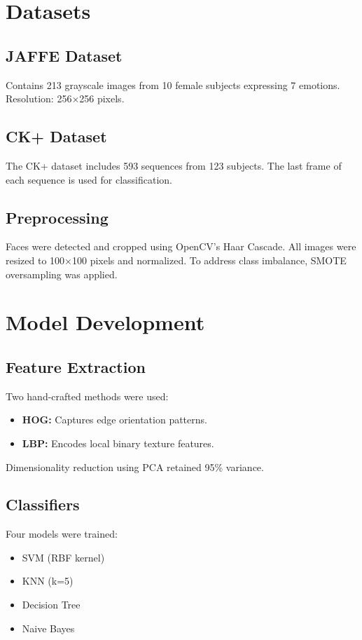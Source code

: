 \documentclass[12pt,a4paper]{article}
\begin{document}
\section{Datasets}
\subsection{JAFFE Dataset}
Contains 213 grayscale images from 10 female subjects expressing 7 emotions. 
Resolution: 256×256 pixels. 

\subsection{CK+ Dataset}
The CK+ dataset includes 593 sequences from 123 subjects. 
The last frame of each sequence is used for classification.

\subsection{Preprocessing}
Faces were detected and cropped using OpenCV’s Haar Cascade. 
All images were resized to 100×100 pixels and normalized. 
To address class imbalance, SMOTE oversampling was applied.

\section{Model Development}
\subsection{Feature Extraction}
Two hand-crafted methods were used:
\begin{itemize}
	\item \textbf{HOG:} Captures edge orientation patterns.
	\item \textbf{LBP:} Encodes local binary texture features.
\end{itemize}

Dimensionality reduction using PCA retained 95\% variance.

\subsection{Classifiers}
Four models were trained:
\begin{itemize}
	\item SVM (RBF kernel)
	\item KNN (k=5)
	\item Decision Tree
	\item Naive Bayes
\end{itemize}
\end{document}
